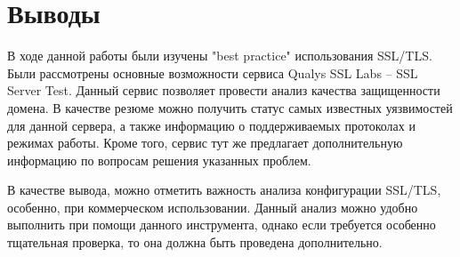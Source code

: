 \documentclass{article}
\begin{document}
\section{Выводы}

В ходе данной работы были изучены "best practice" использования SSL/TLS. Были рассмотрены основные возможности сервиса Qualys SSL Labs – SSL Server Test. Данный сервис позволяет провести анализ качества защищенности домена. В качестве резюме можно получить статус самых известных уязвимостей для данной сервера, а также информацию о поддерживаемых протоколах и режимах работы. Кроме того, сервис тут же предлагает дополнительную информацию по вопросам решения указанных проблем. 

В качестве вывода, можно отметить важность анализа конфигурации SSL/TLS, особенно, при коммерческом использовании. Данный анализ можно удобно выполнить при помощи данного инструмента, однако если требуется особенно тщательная проверка, то она должна быть проведена дополнительно.
 
\end{document}
